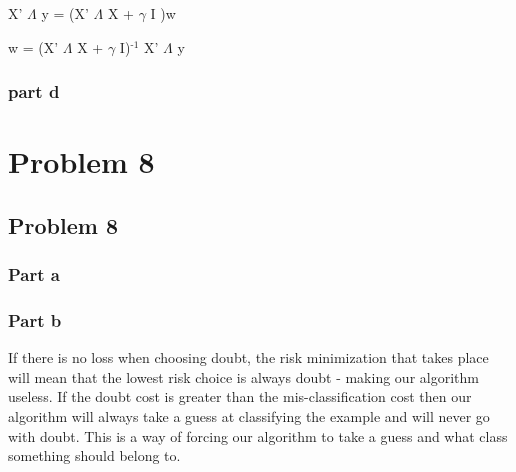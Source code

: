 \documentclass[11pt]{article}
\begin{document}
X' $\Lambda$ y = (X' $\Lambda$ X + $\gamma$ I )w

w = (X' $\Lambda$ X + $\gamma$ I)$^{\text{-1}}$ X' $\Lambda$ y

\subsubsection{part d}
\label{sec-7-1-4}
\section{Problem 8}
\label{sec-8}

\subsection{Problem 8}
\label{sec-8-1}
\subsubsection{Part a}
\label{sec-8-1-1}

\subsubsection{Part b}
\label{sec-8-1-2}
If there is no loss when choosing doubt, the risk minimization that takes place will mean that the lowest risk choice is always doubt - making our algorithm useless. If the doubt cost is greater than the mis-classification cost then our algorithm will always take a guess at classifying the example and will never go with doubt. This is a way of forcing our algorithm to take a guess and what class something should belong to.
\end{document}
